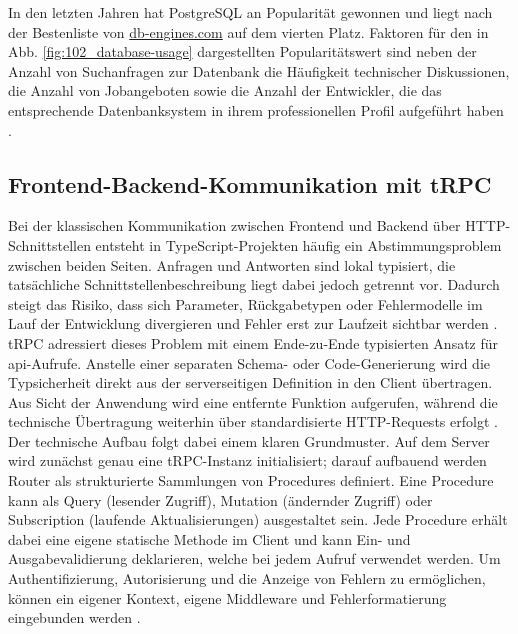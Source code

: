 In den letzten Jahren hat PostgreSQL an Popularität gewonnen und liegt nach der Bestenliste von \href{https://db-engines.com/de/ranking_trend}{db-engines.com} auf dem vierten Platz. 
Faktoren für den in Abb. \ref{fig:102_database-usage} dargestellten Popularitätswert sind neben der Anzahl von Suchanfragen zur Datenbank die Häufigkeit technischer Diskussionen, die Anzahl von Jobangeboten sowie die Anzahl der Entwickler, die das entsprechende Datenbanksystem in ihrem professionellen Profil aufgeführt haben \cite{dbengines2026rankingdefinition}.

\subsection{Frontend-Backend-Kommunikation mit tRPC}
\label{sec:trpc}

Bei der klassischen Kommunikation zwischen Frontend und Backend über HTTP-Schnittstellen entsteht in TypeScript-Projekten häufig ein Abstimmungsproblem zwischen beiden Seiten.
Anfragen und Antworten sind lokal typisiert, die tatsächliche Schnittstellenbeschreibung liegt dabei jedoch getrennt vor.
Dadurch steigt das Risiko, dass sich Parameter, Rückgabetypen oder Fehlermodelle im Lauf der Entwicklung divergieren und Fehler erst zur Laufzeit sichtbar werden \cite{trpc2026documentation}. \\

tRPC adressiert dieses Problem mit einem Ende-zu-Ende typisierten Ansatz für \gls{api}-Aufrufe.
Anstelle einer separaten Schema- oder Code-Generierung wird die Typsicherheit direkt aus der serverseitigen Definition in den Client übertragen.
Aus Sicht der Anwendung wird eine entfernte Funktion aufgerufen, während die technische Übertragung weiterhin über standardisierte HTTP-Requests erfolgt \cite{trpc2026documentation}. \\

Der technische Aufbau folgt dabei einem klaren Grundmuster.
Auf dem Server wird zunächst genau eine tRPC-Instanz initialisiert; darauf aufbauend werden Router als strukturierte Sammlungen von Procedures definiert.
Eine Procedure kann als Query (lesender Zugriff), Mutation (ändernder Zugriff) oder Subscription (laufende Aktualisierungen) ausgestaltet sein.
Jede Procedure erhält dabei eine eigene statische Methode im Client und kann Ein- und Ausgabevalidierung deklarieren, welche bei jedem Aufruf verwendet werden.
Um Authentifizierung, Autorisierung und die Anzeige von Fehlern zu ermöglichen, können ein eigener Kontext, eigene Middleware und Fehlerformatierung eingebunden werden \cite{trpc2026documentation}. \\
 
